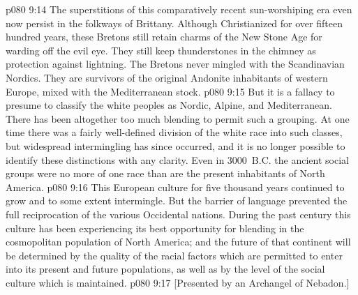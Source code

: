 \vs p080 9:14 The superstitions of this comparatively recent sun\hyp{}worshiping era even now persist in the folkways of Brittany. Although Christianized for over fifteen hundred years, these Bretons still retain charms of the New Stone Age for warding off the evil eye. They still keep thunderstones in the chimney as protection against lightning. The Bretons never mingled with the Scandinavian Nordics. They are survivors of the original Andonite inhabitants of western Europe, mixed with the Mediterranean stock.
\pc \vs p080 9:15 But it is a fallacy to presume to classify the white peoples as Nordic, Alpine, and Mediterranean. There has been altogether too much blending to permit such a grouping. At one time there was a fairly well\hyp{}defined division of the white race into such classes, but widespread intermingling has since occurred, and it is no longer possible to identify these distinctions with any clarity. Even in 3000~B.C. the ancient social groups were no more of one race than are the present inhabitants of North America.
\vs p080 9:16 This European culture for five thousand years continued to grow and to some extent intermingle. But the barrier of language prevented the full reciprocation of the various Occidental nations. During the past century this culture has been experiencing its best opportunity for blending in the cosmopolitan population of North America; and the future of that continent will be determined by the quality of the racial factors which are permitted to enter into its present and future populations, as well as by the level of the social culture which is maintained.\plusone
\vsetoff
\vs p080 9:17 [Presented by an Archangel of Nebadon.]
